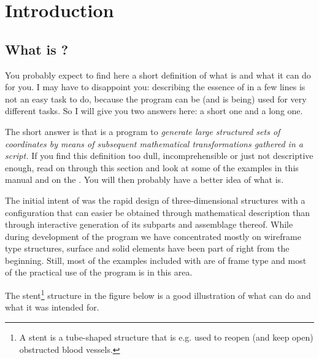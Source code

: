 
\chapter{Introduction}
\label{cha:introduction}

\section{What is \pyformex?}
\label{sec:what-pyformex}
You probably expect to find here a short definition of what \pyformex is and what it can do for you. I may have to disappoint you: describing the essence of \pyformex in a few lines is not an easy task to do, because the program can be (and is being) used for very different tasks. So I will give you two answers here: a short one and a long one.

The short answer is that \pyformex is a program to \emph{generate large structured sets of coordinates by means of subsequent mathematical transformations gathered in a script.}
If you find this definition too dull, incomprehensible or just not descriptive enough, read on through this section and look at some of the examples in this manual and on the . You will then probably have a better idea of what \pyformex{} is. 

The initial intent of \pyformex was the rapid design of three-dimensional structures with a configuration that can easier be obtained through mathematical description than through interactive generation of its subparts and assemblage thereof. While during development of the program we have concentrated mostly on wireframe type structures, surface and solid elements have been part of \pyformex right from the beginning. Still, most of the examples included with \pyformex are of frame type and most of the practical use of the program is in this area.

The stent\footnote{A stent is a tube-shaped structure that is e.g. used to reopen (and keep open) obstructed blood vessels.} structure in the figure below is a good illustration of what \pyformex can do and what it was intended for. 

